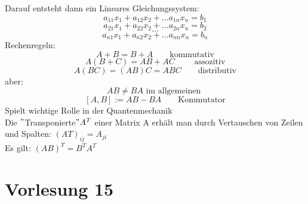 \documentclass[11pt]{article}
\begin{document}
 Darauf entsteht dann ein Lineares Gleichungssystem:
 \[ a_{11} x_1 + a_{12} x_2 + ... a_{1n} x_n = b_1 \]
 \[ a_{21} x_1 + a_{22} x_2 + ... a_{2n} x_n = b_2 \]
 \[ ... \]
 \[ a_{n1} x_1 + a_{n2} x_2 + ... a_{nn} x_n = b_n \]
 Rechenregeln:
 \[ A + B = B+A \qquad \text{kommutativ} \]
 \[ A(B+C) = AB + AC \qquad \text{ assozitiv} \]
 \[ A(BC) = (AB)C = ABC \qquad \text{distributiv} \]
 aber: 
 \[ AB \neq BA \text{ im allgemeinen } \]
 \[ [A,B] := AB- BA \qquad \text{Kommutator} \]
 Spielt wichtige Rolle in der Quantenmechanik\\
 Die $"$Transponierte$" A^T$ einer Matrix A erhält man durch Vertauschen von Zeilen und Spalten: $ (AT)_{ij} = A_{ji} $\\
 Es gilt: $ (AB)^T = B^T A^T $
 \part{Vorlesung 15}
\end{document}
